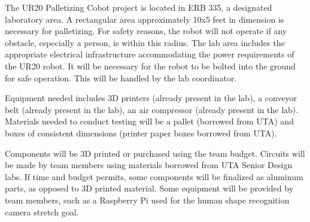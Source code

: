 The UR20 Palletizing Cobot project is located in ERB 335, a designated laboratory area. A rectangular area approximately 10x5 feet in dimension is necessary for palletizing. For safety reasons, the robot will not operate if any obstacle, especially a person, is within this radius. The lab area includes the appropriate electrical infrastructure accommodating the power requirements of the UR20 robot. It will be necessary for the robot to be bolted into the ground for safe operation. This will be handled by the lab coordinator.

Equipment needed includes 3D printers (already present in the lab), a conveyor belt (already present in the lab), an air compressor (already present in the lab). Materials needed to conduct testing will be a pallet (borrowed from UTA) and boxes of consistent dimensions (printer paper boxes borrowed from UTA). 

Components will be 3D printed or purchased using the team budget. Circuits will be made by team members using materials borrowed from UTA Senior Design labs. If time and budget permits, some components will be finalized as aluminum parts, as opposed to 3D printed material. Some equipment will be provided by team members, such as a Raspberry Pi used for the human shape recognition camera stretch goal.